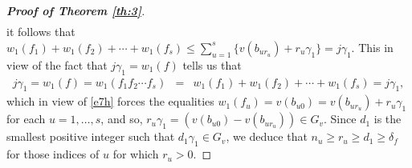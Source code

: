 \documentclass[12pt]{amsart}%
\begin{document}
\begin{proof}[\bf Proof of Theorem \ref{th:3}]
\begin{eqnarray}
\end{eqnarray}
it follows that $w_1(f_1)+w_1(f_2)+\cdots +w_1(f_s)\leq \sum_{u=1}^s\{v(b_{ur_u})+r_u\gamma_1\}=j\gamma_1$. This in view of the fact that $j\gamma_1=w_1(f)$ tells us that
\begin{eqnarray*}
j\gamma_1=w_1(f)=w_1(f_1f_2\cdots f_s)&=&w_1(f_1)+w_1(f_2)+\cdots+w_1(f_s)=j\gamma_1, %
\end{eqnarray*}
which in view of \eqref{e7h} forces the equalities $w_1(f_u)=v(b_{u0})=v(b_{ur_u})+r_u\gamma_1$ for each $u=1,\ldots,s$, and so, $r_u\gamma_1=(v(b_{u0})-v(b_{ur_u})) \in G_v$. Since $d_1$ is the smallest positive integer such that $d_1\gamma_1 \in G_v$, we deduce that $n_u\geq r_u\geq d_1\geq \delta_f$ for those indices of $u$ for which $r_u>0$.


\end{proof}
\end{document}

